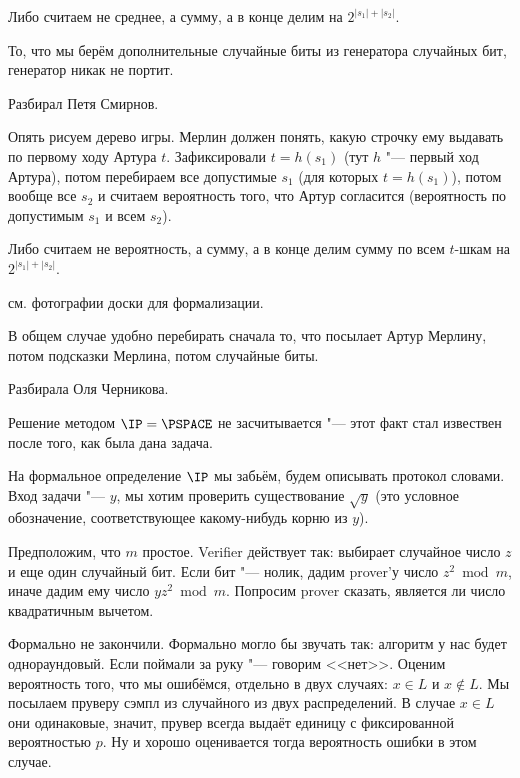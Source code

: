 	Либо считаем не среднее, а сумму, а в конце делим на $2^{|s_1|+|s_2|}$.

	\begin{Rem}
		То, что мы берём дополнительные случайные биты из генератора случайных бит, генератор никак не портит.
	\end{Rem}

	Разбирал Петя Смирнов.

	Опять рисуем дерево игры.
	Мерлин должен понять, какую строчку ему выдавать по первому ходу Артура $t$.
	Зафиксировали $t=h(s_1)$ (тут $h$ "--- первый ход Артура), потом перебираем
	все допустимые $s_1$ (для которых $t=h(s_1)$), потом вообще все $s_2$ и считаем вероятность того,
	что Артур согласится (вероятность по допустимым $s_1$ и всем $s_2$).

	Либо считаем не вероятность, а сумму, а в конце делим сумму по всем $t$-шкам на $2^{|s_1|+|s_2|}$.

	\TODO см. фотографии доски для формализации.

	\begin{Rem}
		В общем случае удобно перебирать сначала то, что посылает Артур Мерлину, потом
		подсказки Мерлина, потом случайные биты.
	\end{Rem}

	Разбирала Оля Черникова.

	\begin{Rem}
		Решение методом $\IP=\PSPACE$ не засчитывается "--- этот факт стал извествен после того, как была дана задача.
	\end{Rem}

	На формальное определение $\IP$ мы забьём, будем описывать протокол словами.
	Вход задачи "--- $y$, мы хотим проверить существование $\sqrt y$ (это условное обозначение,
	соответствующее какому-нибудь корню из $y$).

	Предположим, что $m$ простое.
	Verifier действует так: выбирает случайное число $z$ и еще один случайный бит.
	Если бит "--- нолик, дадим prover'у число $z^2 \bmod m$, иначе дадим ему число $yz^2 \bmod m$.
	Попросим prover сказать, является ли число квадратичным вычетом.

	Формально не закончили.
	Формально могло бы звучать так: алгоритм у нас будет однораундовый.
	Если поймали за руку "--- говорим <<нет>>.
	Оценим вероятность того, что мы ошибёмся, отдельно в двух случаях: $x \in L$ и $x \notin L$.
	Мы посылаем пруверу сэмпл из случайного из двух распределений.
	В случае $x \in L$ они одинаковые, значит, прувер всегда выдаёт единицу с фиксированной вероятностью $p$.
	Ну и хорошо оценивается тогда вероятность ошибки в этом случае.
